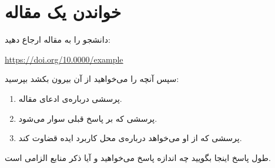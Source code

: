 \section{خواندن یک مقاله}

دانشجو را به مقاله ارجاع دهید:

\url{https://doi.org/10.0000/example}

سپس آنچه را می‌خواهید از آن بیرون بکشد بپرسید:

\begin{enumerate}
    \item پرسشی درباره‌ی ادعای مقاله.
    \item پرسشی که بر پاسخ قبلی سوار می‌شود.
    \item پرسشی که از او می‌خواهد درباره‌ی محل کاربرد ایده قضاوت کند.
\end{enumerate}

\begin{neobox}[neotitlefont=\pixelfont]{طول پاسخ}
    اینجا بگویید چه اندازه پاسخ می‌خواهید و آیا ذکر منابع الزامی است.
\end{neobox}
